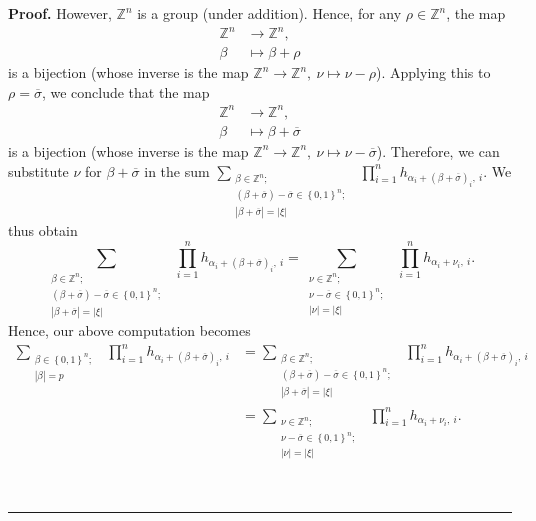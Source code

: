 \documentclass
[numbers=enddot,12pt,final,onecolumn,notitlepage,english]{scrartcl}%
\theoremstyle{definition}
\newenvironment{proof}[1][Proof]{\noindent\textbf{#1.} }{\ \rule{0.5em}{0.5em}}
\let\sumnonlimits\sum
\let\prodnonlimits\prod
\renewcommand{\sum}{\sumnonlimits\limits}
\renewcommand{\prod}{\prodnonlimits\limits}
\newenvironment{verlong}{}{}
\begin{document}
\begin{verlong}
\begin{proof}
However, $\mathbb{Z}^{n}$ is a group (under addition). Hence, for any $\rho
\in\mathbb{Z}^{n}$, the map%
\begin{align*}
\mathbb{Z}^{n}  &  \rightarrow\mathbb{Z}^{n},\\
\beta &  \mapsto\beta+\rho
\end{align*}
is a bijection (whose inverse is the map $\mathbb{Z}^{n}\rightarrow
\mathbb{Z}^{n},\ \nu\mapsto\nu-\rho$). Applying this to $\rho=\overline
{\sigma}$, we conclude that the map
\begin{align*}
\mathbb{Z}^{n}  &  \rightarrow\mathbb{Z}^{n},\\
\beta &  \mapsto\beta+\overline{\sigma}%
\end{align*}
is a bijection (whose inverse is the map $\mathbb{Z}^{n}\rightarrow
\mathbb{Z}^{n},\ \nu\mapsto\nu-\overline{\sigma}$). Therefore, we can
substitute $\nu$ for $\beta+\overline{\sigma}$ in the sum $\sum
_{\substack{\beta\in\mathbb{Z}^{n};\\\left(  \beta+\overline{\sigma}\right)
-\overline{\sigma}\in\left\{  0,1\right\}  ^{n};\\\left\vert \beta
+\overline{\sigma}\right\vert =\left\vert \xi\right\vert }}\ \ \prod_{i=1}%
^{n}h_{\alpha_{i}+\left(  \beta+\overline{\sigma}\right)  _{i},\ i}$. We thus
obtain%
\[
\sum_{\substack{\beta\in\mathbb{Z}^{n};\\\left(  \beta+\overline{\sigma
}\right)  -\overline{\sigma}\in\left\{  0,1\right\}  ^{n};\\\left\vert
\beta+\overline{\sigma}\right\vert =\left\vert \xi\right\vert }}\ \ \prod
_{i=1}^{n}h_{\alpha_{i}+\left(  \beta+\overline{\sigma}\right)  _{i},\ i}%
=\sum_{\substack{\nu\in\mathbb{Z}^{n};\\\nu-\overline{\sigma}\in\left\{
0,1\right\}  ^{n};\\\left\vert \nu\right\vert =\left\vert \xi\right\vert
}}\ \ \prod_{i=1}^{n}h_{\alpha_{i}+\nu_{i},\ i}.
\]
Hence, our above computation becomes%
\begin{align}
\sum_{\substack{\beta\in\left\{  0,1\right\}  ^{n};\\\left\vert \beta
\right\vert =p}}\ \ \prod_{i=1}^{n}h_{\alpha_{i}+\left(  \beta+\overline
{\sigma}\right)  _{i},\ i}  &  =\sum_{\substack{\beta\in\mathbb{Z}%
^{n};\\\left(  \beta+\overline{\sigma}\right)  -\overline{\sigma}\in\left\{
0,1\right\}  ^{n};\\\left\vert \beta+\overline{\sigma}\right\vert =\left\vert
\xi\right\vert }}\ \ \prod_{i=1}^{n}h_{\alpha_{i}+\left(  \beta+\overline
{\sigma}\right)  _{i},\ i}\nonumber\\
&  =\sum_{\substack{\nu\in\mathbb{Z}^{n};\\\nu-\overline{\sigma}\in\left\{
0,1\right\}  ^{n};\\\left\vert \nu\right\vert =\left\vert \xi\right\vert
}}\ \ \prod_{i=1}^{n}h_{\alpha_{i}+\nu_{i},\ i}.
\label{pf.thm.pre-pieri2.innersum}%
\end{align}



\end{proof}
\end{verlong}
\end{document}
